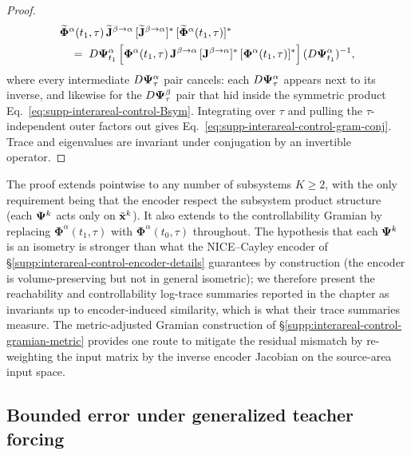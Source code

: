 \begin{proof}
\begin{align}
&\widetilde{\mathbf{\Phi}}^{\alpha}(t_{1},\tau)\,\widetilde{\mathbf{J}}^{\beta\to\alpha}\,[\widetilde{\mathbf{J}}^{\beta\to\alpha}]^{*}\,[\widetilde{\mathbf{\Phi}}^{\alpha}(t_{1},\tau)]^{*} \nonumber\\
&\quad=\; D\vb{\Psi}^{\alpha}_{t_{1}}\,\Bigl[\mathbf{\Phi}^{\alpha}(t_{1},\tau)\,\mathbf{J}^{\beta\to\alpha}\,[\mathbf{J}^{\beta\to\alpha}]^{*}\,[\mathbf{\Phi}^{\alpha}(t_{1},\tau)]^{*}\Bigr]\,(D\vb{\Psi}^{\alpha}_{t_{1}})^{-1},
\end{align}
where every intermediate $D\vb{\Psi}^{\alpha}_{\tau}$ pair cancels: each $D\vb{\Psi}^{\alpha}_{\tau}$ appears next to its inverse, and likewise for the $D\vb{\Psi}^{\beta}_{\tau}$ pair that hid inside the symmetric product Eq.~\ref{eq:supp-interareal-control-Bsym}. Integrating over $\tau$ and pulling the $\tau$-independent outer factors out gives Eq.~\ref{eq:supp-interareal-control-gram-conj}. Trace and eigenvalues are invariant under conjugation by an invertible operator. \end{proof}

\begin{remark}
The proof extends pointwise to any number of subsystems $K\geq 2$, with the only requirement being that the encoder respect the subsystem product structure (each $\vb{\Psi}^{k}$ acts only on $\tilde{\vb{x}}^{k}$). It also extends to the controllability Gramian by replacing $\mathbf{\Phi}^{\alpha}(t_{1},\tau)$ with $\mathbf{\Phi}^{\alpha}(t_{0},\tau)$ throughout. The hypothesis that each $\vb{\Psi}^{k}$ is an isometry is stronger than what the NICE--Cayley encoder of \S\ref{supp:interareal-control-encoder-details} guarantees by construction (the encoder is volume-preserving but not in general isometric); we therefore present the reachability and controllability log-trace summaries reported in the chapter as invariants up to encoder-induced similarity, which is what their trace summaries measure. The metric-adjusted Gramian construction of \S\ref{supp:interareal-control-gramian-metric} provides one route to mitigate the residual mismatch by re-weighting the input matrix by the inverse encoder Jacobian on the source-area input space.
\end{remark}

\subsection{Bounded error under generalized teacher forcing}\label{supp:interareal-control-proof-gtf}

